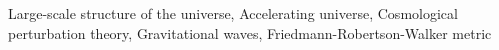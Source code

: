 \documentclass[twocolumn]{aastex631}
\begin{document}
Large-scale structure of the universe, Accelerating universe, Cosmological perturbation theory, Gravitational waves, Friedmann-Robertson-Walker metric
\end{document}
